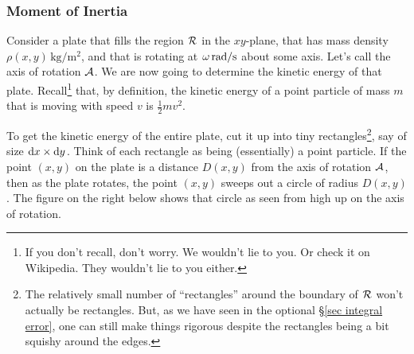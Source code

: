 \subsubsection{Moment of Inertia}
Consider a plate that fills the region $\mathcal{R}$ in the $xy$-plane,
that has mass density $\rho(x,y)\,\text{kg}/\text{m}^2$, and that is
rotating at $\omega\,\text{rad}/\text{s}$  about some axis.
Let's call the axis of rotation $\mathcal{A}$.
We are now going to determine the kinetic energy of that plate. 
Recall\footnote{If you don't recall, don't worry. We wouldn't lie to you.
Or check it on Wikipedia. They wouldn't lie to you either.
} 
that, by definition, the kinetic energy of a point particle of
mass $m$ that is moving with speed $v$ is $\frac{1}{2}mv^2$.

To get the kinetic energy of the entire plate, cut it up into tiny
rectangles\footnote{The relatively small number of ``rectangles''
around the boundary of $\mathcal{R}$ won't actually be rectangles. But, as we have seen
in the optional \S\ref{sec integral error}, one can still make things 
rigorous despite the rectangles being a bit squishy around the edges.}, 
say of size $\mathrm{d}x\times\mathrm{d}y$. Think of
each rectangle as being (essentially) a point particle. If the  point
$(x,y)$ on the plate is a distance $D(x,y)$ from the axis of rotation
$\mathcal{A}$, then as the plate rotates, the point $(x,y)$ sweeps out a circle of
radius $D(x,y)$. The figure on the right below shows that circle as seen
from high up on the axis of rotation.
